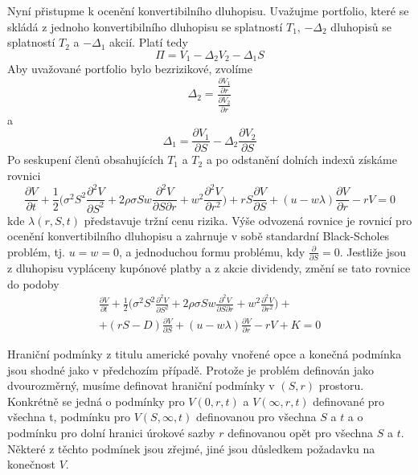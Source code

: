 \documentclass[a4paper]{book}
\begin{document}
Nyní přistupme k ocenění konvertibilního dluhopisu. Uvažujme portfolio, které se skládá z jednoho konvertibilního dluhopisu se splatností $T_1$, $-\Delta_2$ dluhopisů se splatností $T_2$ a $-\Delta_1$ akcií. Platí tedy
\begin{equation*}
\Pi = V_1 - \Delta_2 V_2 - \Delta_1 S
\end{equation*}
Aby uvažované portfolio bylo bezrizikové, zvolíme
\begin{equation*}
\Delta_2 = \frac{\frac{\partial V_1}{\partial r}}{\frac{\partial V_2}{\partial r}}
\end{equation*}
a
\begin{equation*}
\Delta_1 = \frac{\partial V_1}{\partial S} - \Delta_2 \frac{\partial V_2}{\partial S}
\end{equation*}
Po seskupení členů obsahujících $T_1$ a $T_2$ a po odstanění dolních indexů získáme rovnici
\begin{equation*}
\frac{\partial V}{\partial t} + \frac{1}{2}\Bigg( \sigma^2 S^2 \frac{\partial^2 V}{\partial S^2} + 2 \rho \sigma S w \frac{\partial^2 V}{\partial S \partial r} + w^2 \frac{\partial^2 V}{\partial r^2} \Bigg) + rS \frac{\partial V}{\partial S} + (u - w \lambda)\frac{\partial V}{\partial r} - rV = 0
\end{equation*}
kde $\lambda(r,S,t)$ představuje tržní cenu rizika. Výše odvozená rovnice je rovnicí pro ocenění konvertibilního dluhopisu a zahrnuje v sobě standardní Black-Scholes problém, tj. $u = w = 0$, a jednoduchou formu problému, kdy $\frac{\partial}{\partial S} = 0$. Jestliže jsou z dluhopisu vypláceny kupónové platby a z akcie dividendy, změní se tato rovnice do podoby 
\begin{multline}
\frac{\partial V}{\partial t} + \frac{1}{2}\Bigg( \sigma^2 S^2 \frac{\partial^2 V}{\partial S^2} + 2 \rho \sigma S w \frac{\partial^2 V}{\partial S \partial r} + w^2 \frac{\partial^2 V}{\partial r^2} \Bigg) + \\
+ (rS - D) \frac{\partial V}{\partial S} + (u - w \lambda)\frac{\partial V}{\partial r} - rV + K = 0
\end{multline}

Hraniční podmínky z titulu americké povahy vnořené opce a konečná podmínka jsou shodné jako v předchozím případě. Protože je  problém definován jako dvourozměrný, musíme definovat hraniční podmínky v $(S,r)$ prostoru. Konkrétně se jedná o podmínky pro $V(0,r,t)$ a $V(\infty, r,t)$ definované pro všechna t, podmínku pro $V(S, \infty, t)$ definovanou pro všechna $S$ a $t$ a o podmínku pro dolní hranici úrokové sazby $r$ definovanou opět pro všechna $S$ a $t$. Některé z těchto podmínek jsou zřejmé, jiné jsou důsledkem požadavku na konečnost $V$.
\end{document}
